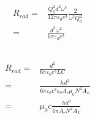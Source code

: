 \documentclass[10pt,fleqn]{article}
\newcommand{\eqar}[1]
{
  \begin{align*}
    #1
  \end{align*}
}
\begin{document}
\subsection{}
\eqar{
  R_{rad}=&\frac{Q_0^2d^2\omega^4}{12\pi\varepsilon_0c^3}\frac{2}{\omega^2 Q_0^2}\\
  =&\frac{d^2\omega^2}{6\pi\varepsilon_0c^3}
}
\subsection{}
\eqar{
  R_{rad}=&\frac{d^2}{6\pi\varepsilon_0c^3LC}\\
  =&\frac{hd^3}{6\pi\varepsilon_0c^3\varepsilon_0 A_c\mu_0N^2A_L}\\
  =&\mu_0 c\frac{hd^3}{6\pi A_c N^2A_L}
}
\section{}
\end{document}
